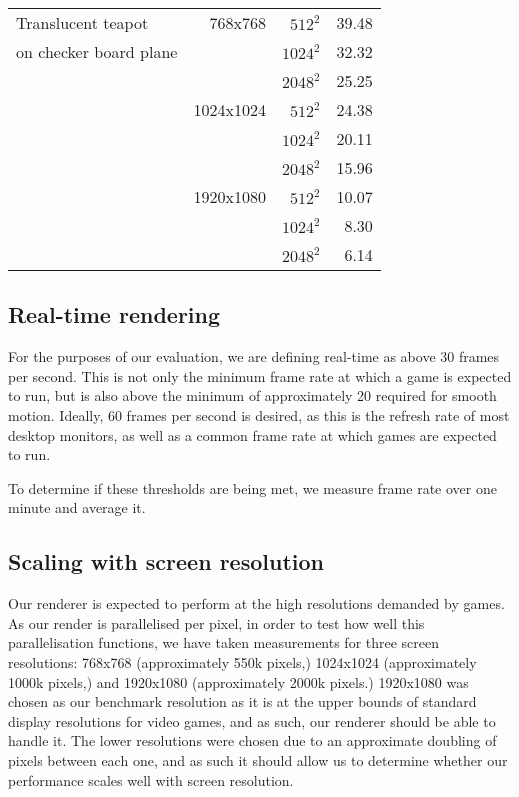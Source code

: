 \begin{tabular}{|l|r|r|r|}
	\quad 4 \quad		Translucent teapot				& 768x768		& $512^2 $	&	39.48	\\
		\cline{3-4}
	\quad \quad \quad	on checker board plane			& 				& $1024^2 $	&	32.32	\\
	\cline{3-4}
														&				& $2048^2 $ &	25.25	\\
		\cline{2-4}
														& 1024x1024		& $512^2 $	&	24.38	\\
		\cline{3-4}
														& 				& $1024^2 $	&	20.11	\\
	\cline{3-4}
														&				& $2048^2 $ &	15.96	\\
		\cline{2-4}
														& 1920x1080		& $512^2 $	&	10.07	\\
		\cline{3-4}
														& 				& $1024^2 $	&	8.30	\\
	\cline{3-4}
														&				& $2048^2 $ &	6.14	\\
\hline
\end{tabular}

\subsection{Real-time rendering}
For the purposes of our evaluation, we are defining real-time as above 30 frames per second. This is not only the minimum frame rate at which a game is expected to run, but is also above the minimum of approximately 20 required for smooth motion. Ideally, 60 frames per second is desired, as this is the refresh rate of most desktop monitors, as well as a common frame rate at which games are expected to run.

To determine if these thresholds are being met, we measure frame rate over one minute and average it.

\subsection{Scaling with screen resolution}
Our renderer is expected to perform at the high resolutions demanded by games. As our render is parallelised per pixel, in order to test how well this parallelisation functions, we have taken measurements for three screen resolutions: 768x768 (approximately 550k pixels,) 1024x1024 (approximately 1000k pixels,) and 1920x1080 (approximately 2000k pixels.) 1920x1080 was chosen as our benchmark resolution as it is at the upper bounds of standard display resolutions for video games, and as such, our renderer should be able to handle it. The lower resolutions were chosen due to an approximate doubling of pixels between each one, and as such it should allow us to determine whether our performance scales well with screen resolution.

